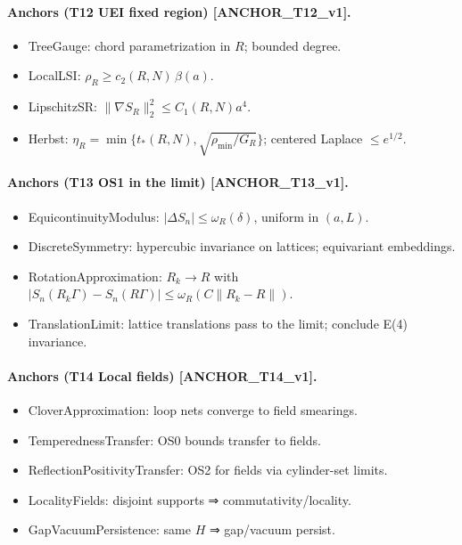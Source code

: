 \documentclass[11pt]{amsart}
\begin{document}
\paragraph{Anchors (T12 UEI fixed region) [ANCHOR\_T12\_v1].}
\begin{itemize}
  \item TreeGauge: chord parametrization in $R$; bounded degree.
  \item LocalLSI: $\rho_R\ge c_2(R,N)\,\beta(a)$.
  \item LipschitzSR: $\|\nabla S_R\|_2^2\le C_1(R,N)a^4$.
  \item Herbst: $\eta_R=\min\{t_*(R,N),\sqrt{\rho_{\min}/G_R}\}$; centered Laplace $\le e^{1/2}$.
\end{itemize}

\paragraph{Anchors (T13 OS1 in the limit) [ANCHOR\_T13\_v1].}
\begin{itemize}
  \item EquicontinuityModulus: $|\Delta S_n|\le \omega_R(\delta)$, uniform in $(a,L)$.
  \item DiscreteSymmetry: hypercubic invariance on lattices; equivariant embeddings.
  \item RotationApproximation: $R_k\to R$ with $|S_n(R_k\Gamma)−S_n(R\Gamma)|\le \omega_R(C\|R_k−R\|)$.
  \item TranslationLimit: lattice translations pass to the limit; conclude E(4) invariance.
\end{itemize}

\paragraph{Anchors (T14 Local fields) [ANCHOR\_T14\_v1].}
\begin{itemize}
  \item CloverApproximation: loop nets converge to field smearings.
  \item TemperednessTransfer: OS0 bounds transfer to fields.
  \item ReflectionPositivityTransfer: OS2 for fields via cylinder-set limits.
  \item LocalityFields: disjoint supports ⇒ commutativity/locality.
  \item GapVacuumPersistence: same $H$ ⇒ gap/vacuum persist.
\end{itemize}
\end{document}
